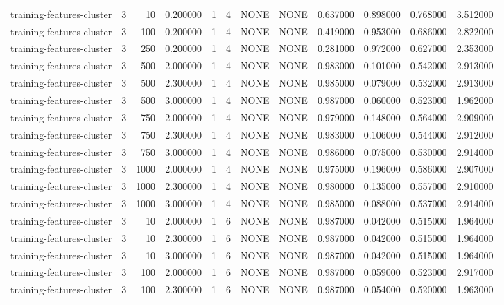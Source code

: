 \begin{tabular}{lrrrllllrrrr}
training-features-cluster & 3 & 10 & 0.200000 & 1 & 4 & NONE & NONE & 0.637000 & 0.898000 & 0.768000 & 3.512000 \\
training-features-cluster & 3 & 100 & 0.200000 & 1 & 4 & NONE & NONE & 0.419000 & 0.953000 & 0.686000 & 2.822000 \\
training-features-cluster & 3 & 250 & 0.200000 & 1 & 4 & NONE & NONE & 0.281000 & 0.972000 & 0.627000 & 2.353000 \\
training-features-cluster & 3 & 500 & 2.000000 & 1 & 4 & NONE & NONE & 0.983000 & 0.101000 & 0.542000 & 2.913000 \\
training-features-cluster & 3 & 500 & 2.300000 & 1 & 4 & NONE & NONE & 0.985000 & 0.079000 & 0.532000 & 2.913000 \\
training-features-cluster & 3 & 500 & 3.000000 & 1 & 4 & NONE & NONE & 0.987000 & 0.060000 & 0.523000 & 1.962000 \\
training-features-cluster & 3 & 750 & 2.000000 & 1 & 4 & NONE & NONE & 0.979000 & 0.148000 & 0.564000 & 2.909000 \\
training-features-cluster & 3 & 750 & 2.300000 & 1 & 4 & NONE & NONE & 0.983000 & 0.106000 & 0.544000 & 2.912000 \\
training-features-cluster & 3 & 750 & 3.000000 & 1 & 4 & NONE & NONE & 0.986000 & 0.075000 & 0.530000 & 2.914000 \\
training-features-cluster & 3 & 1000 & 2.000000 & 1 & 4 & NONE & NONE & 0.975000 & 0.196000 & 0.586000 & 2.907000 \\
training-features-cluster & 3 & 1000 & 2.300000 & 1 & 4 & NONE & NONE & 0.980000 & 0.135000 & 0.557000 & 2.910000 \\
training-features-cluster & 3 & 1000 & 3.000000 & 1 & 4 & NONE & NONE & 0.985000 & 0.088000 & 0.537000 & 2.914000 \\
training-features-cluster & 3 & 10 & 2.000000 & 1 & 6 & NONE & NONE & 0.987000 & 0.042000 & 0.515000 & 1.964000 \\
training-features-cluster & 3 & 10 & 2.300000 & 1 & 6 & NONE & NONE & 0.987000 & 0.042000 & 0.515000 & 1.964000 \\
training-features-cluster & 3 & 10 & 3.000000 & 1 & 6 & NONE & NONE & 0.987000 & 0.042000 & 0.515000 & 1.964000 \\
training-features-cluster & 3 & 100 & 2.000000 & 1 & 6 & NONE & NONE & 0.987000 & 0.059000 & 0.523000 & 2.917000 \\
training-features-cluster & 3 & 100 & 2.300000 & 1 & 6 & NONE & NONE & 0.987000 & 0.054000 & 0.520000 & 1.963000 \\

\end{tabular}
